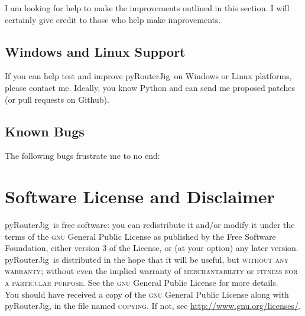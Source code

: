 \documentclass[12pt,final]{article}
\newcommand{\codename}[0]{pyRouterJig}
\begin{document}
I am looking for help to make the improvements outlined in this section.  I
will certainly give credit to those who help make improvements.

\subsection{Windows and Linux Support}

If you can help test and improve \codename~on Windows or Linux platforms,
please contact me.  Ideally, you know Python and can send me proposed patches
(or pull requests on Github).

\subsection{Known Bugs}

The following bugs frustrate me to no end:



\section{Software License and Disclaimer}
\label{sec:license}

\codename~is free software: you can redistribute it and/or modify it under
the terms of the \textsc{gnu} General Public License as published by the Free Software
Foundation, either version 3 of the License, or (at your option) any later
version.\\

\codename~is distributed in the hope that it will be useful, but
\textsc{without any warranty}; without even the implied warranty of
\textsc{merchantability} or \textsc{fitness for a particular
  purpose}.  See the \textsc{gnu} General Public License for more details.\\

You should have received a copy of the \textsc{gnu} General Public License along with
\codename, in the file named \textsc{copying}.  If not, see
\url{http://www.gnu.org/licenses/}.\\
\end{document}
